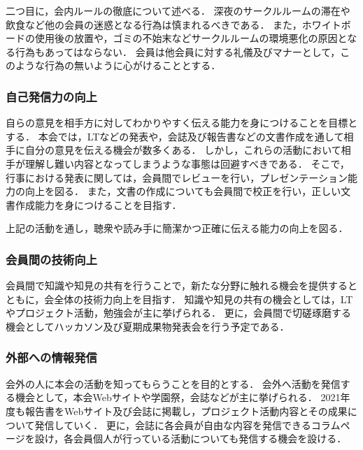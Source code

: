   二つ目に，会内ルールの徹底について述べる．
  深夜のサークルルームの滞在や飲食など他の会員の迷惑となる行為は慎まれるべきである．
  また，ホワイトボードの使用後の放置や，ゴミの不始末などサークルルームの環境悪化の原因となる行為もあってはならない．
  会員は他会員に対する礼儀及びマナーとして，このような行為の無いように心がけることとする．
  
\subsubsection*{自己発信力の向上}
  自らの意見を相手方に対してわかりやすく伝える能力を身につけることを目標とする．
  本会では，LTなどの発表や，会誌及び報告書などの文書作成を通して相手に自分の意見を伝える機会が数多くある．
  しかし，これらの活動において相手が理解し難い内容となってしまうような事態は回避すべきである．
  そこで，行事における発表に関しては，会員間でレビューを行い，プレゼンテーション能力の向上を図る．
  また，文書の作成についても会員間で校正を行い，正しい文書作成能力を身につけることを目指す．

  上記の活動を通し，聴衆や読み手に簡潔かつ正確に伝える能力の向上を図る．

\subsubsection*{会員間の技術向上}
  会員間で知識や知見の共有を行うことで，新たな分野に触れる機会を提供するとともに，会全体の技術力向上を目指す．
  知識や知見の共有の機会としては，LTやプロジェクト活動，勉強会が主に挙げられる．
  更に，会員間で切磋琢磨する機会としてハッカソン及び夏期成果物発表会を行う予定である．

\subsubsection*{外部への情報発信}
  会外の人に本会の活動を知ってもらうことを目的とする．
  会外へ活動を発信する機会として，本会Webサイトや学園祭，会誌などが主に挙げられる．
  2021年度も報告書をWebサイト及び会誌に掲載し，プロジェクト活動内容とその成果について発信していく．
  更に，会誌に各会員が自由な内容を発信できるコラムページを設け，各会員個人が行っている活動についても発信する機会を設ける．
  